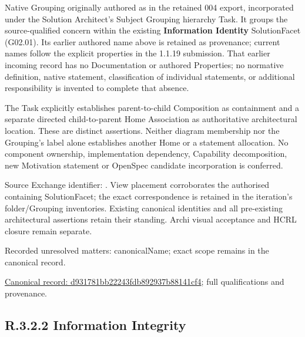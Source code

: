 Native Grouping originally authored as \texttt{} in the retained 004 export,
incorporated under the Solution Architect's Subject Grouping hierarchy Task.
It groups the source-qualified \texttt{} concern within
the existing \textbf{Information Identity} SolutionFacet (G02.01). Its earlier authored name above is retained as provenance; current names
follow the explicit properties in the 1.1.19 submission.
That earlier incoming record has no Documentation or authored Properties; no normative
definition, native statement, classification of individual statements, or
additional responsibility is invented to complete that absence.



The Task explicitly establishes parent-to-child Composition as containment and
a separate directed child-to-parent Home Association as authoritative architectural
location. These are distinct assertions. Neither diagram membership nor the
Grouping's label alone establishes another Home or a statement allocation.
No component ownership, implementation dependency, Capability decomposition,
new Motivation statement or OpenSpec candidate incorporation is conferred.



Source Exchange identifier: \texttt{}. View placement corroborates
the authorised containing SolutionFacet; the exact correspondence is retained in the
iteration's folder/Grouping inventories. Existing canonical identities and all
pre-existing architectural assertions retain their standing. Archi visual
acceptance and HCRL closure remain separate.


{\small Recorded unresolved matters: canonicalName; exact scope remains in the canonical record.}\par
{\footnotesize \href{../../../../../../../continuum/grouping/d931781bb22243fdb892937b88141cf4.md}{Canonical record: d931781bb22243fdb892937b88141cf4}; full qualifications and provenance.}\par
\subsection*{R.3.2.2 Information Integrity}
\label{navigation:R.3.2.2}


